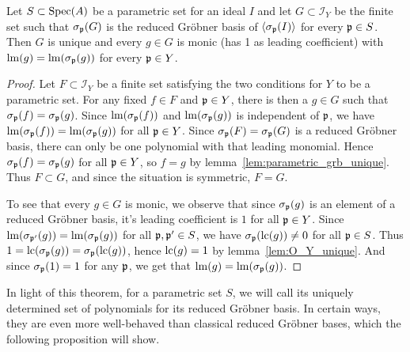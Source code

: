 \begin{theorem}\label{thm:red_grb_uniq_and_monic_and_stable}
  Let $S \subset \operatorname{Spec}(A)$ be a parametric set for an ideal $I$ and let $G \subset \mathcal I_{Y}$ be the finite set such that $\sigma_{\mathfrak p}(G)$ is the reduced Gröbner basis of $\langle \sigma_{\mathfrak p}(I) \rangle$ for every $\mathfrak p \in S$. Then $G$ is unique and every $g \in G$ is monic (has 1 as leading coefficient) with $\operatorname{lm}(g) = \operatorname{lm}(\sigma_{\mathfrak p}(g))$ for every $\mathfrak p \in Y$.
\end{theorem}
\begin{proof}
  Let $F \subset \mathcal I_{Y}$ be a finite set satisfying the two conditions for $Y$ to be a parametric set. For any fixed $f \in F$ and $\mathfrak p \in Y$, there is then a $g \in G$ such that $\sigma_{\mathfrak p}(f) = \sigma_{\mathfrak p}(g)$. Since $\operatorname{lm}(\sigma_{\mathfrak p}(f))$ and $\operatorname{lm}(\sigma_{\mathfrak p}(g))$ is independent of $\mathfrak p$, we have $\operatorname{lm}(\sigma_{\mathfrak p}(f)) = \operatorname{lm}(\sigma_{\mathfrak p}(g))$ for all $\mathfrak p \in Y$. Since $\sigma_{\mathfrak p}(F) = \sigma_{\mathfrak p}(G)$ is a reduced Gröbner basis, there can only be one polynomial with that leading monomial. Hence $\sigma_{\mathfrak p}(f) = \sigma_{\mathfrak p}(g)$ for all $\mathfrak p \in Y$, so $f = g$ by lemma~\ref{lem:parametric_grb_unique}. Thus $F \subset G$, and since the situation is symmetric, $F = G$.

  To see that every $g \in G$ is monic, we observe that since $\sigma_{\mathfrak p}(g)$ is an element of a reduced Gröbner basis, it's leading coefficient is $1$ for all $\mathfrak p \in Y$. Since $\operatorname{lm}(\sigma_{\mathfrak p'}(g)) = \operatorname{lm}(\sigma_{\mathfrak p}(g))$ for all $\mathfrak p, \mathfrak p' \in S$, we have $\sigma_{\mathfrak p}(\operatorname{lc}(g)) \neq 0$ for all $\mathfrak p \in S$. Thus $1 = \operatorname{lc}(\sigma_{\mathfrak p}(g)) = \sigma_{\mathfrak p}(\operatorname{lc}(g))$, hence $\operatorname{lc}(g) = 1$ by lemma~\ref{lem:O_Y_unique}. And since $\sigma_{\mathfrak p}(1) = 1$ for any $\mathfrak p$, we get that $\operatorname{lm}(g) = \operatorname{lm}(\sigma_{\mathfrak p}(g))$.
\end{proof}

In light of this theorem, for a parametric set $S$, we will call its uniquely determined set of polynomials for its reduced Gröbner basis. In certain ways, they are even more well-behaved than classical reduced Gröbner bases, which the following proposition will show.

